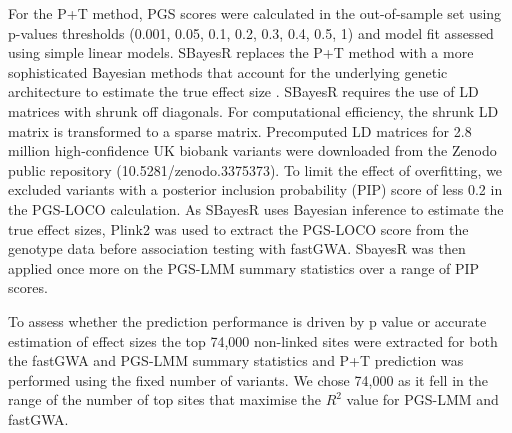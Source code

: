 \documentclass[doublespacing]{bmcart}
\begin{document}
For the P+T method, PGS scores were calculated in the out-of-sample set using p-values thresholds (0.001, 0.05, 0.1, 0.2, 0.3, 0.4, 0.5, 1) and model fit assessed using simple linear models. SBayesR replaces the P+T method with a more sophisticated Bayesian methods that account for the underlying genetic architecture to estimate the true effect size \cite{lloyd2019improved}. SBayesR requires the use of LD matrices with shrunk off diagonals. For computational efficiency, the shrunk LD matrix is transformed to a sparse matrix. Precomputed LD matrices for 2.8 million high-confidence UK biobank variants were downloaded from the Zenodo public repository (10.5281/zenodo.3375373). To limit the effect of overfitting, we excluded variants with a posterior inclusion probability (PIP) score of less 0.2 in the PGS-LOCO calculation. As SBayesR uses Bayesian inference to estimate the true effect sizes, Plink2 was used to extract the PGS-LOCO score from the genotype data before association testing with fastGWA. SbayesR was then applied once more on the PGS-LMM summary statistics over a range of PIP scores. \par

To assess whether the prediction performance is driven by p value or accurate estimation of effect sizes the top 74,000 non-linked sites were extracted for both the fastGWA and PGS-LMM summary statistics and P+T prediction was performed using the fixed number of variants. We chose 74,000 as it fell in the range of the number of top sites that maximise the $R^2$ value for PGS-LMM and fastGWA. 




\end{document}
